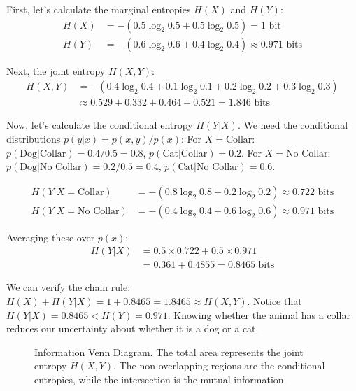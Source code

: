 First, let's calculate the marginal entropies $H(X)$ and $H(Y)$:
\begin{align*}
    H(X) &= - (0.5 \log_2 0.5 + 0.5 \log_2 0.5) = 1 \text{ bit} \\
    H(Y) &= - (0.6 \log_2 0.6 + 0.4 \log_2 0.4) \approx 0.971 \text{ bits}
\end{align*}

Next, the joint entropy $H(X, Y)$:
\begin{align*}
    H(X, Y) &= - (0.4 \log_2 0.4 + 0.1 \log_2 0.1 + 0.2 \log_2 0.2 + 0.3 \log_2 0.3) \\
    &\approx 0.529 + 0.332 + 0.464 + 0.521 = 1.846 \text{ bits}
\end{align*}

Now, let's calculate the conditional entropy $H(Y|X)$. We need the conditional distributions $p(y|x) = p(x, y)/p(x)$:
For $X = \text{Collar}$: $p(\text{Dog}|\text{Collar}) = 0.4/0.5 = 0.8$, $p(\text{Cat}|\text{Collar}) = 0.2$.
For $X = \text{No Collar}$: $p(\text{Dog}|\text{No Collar}) = 0.2/0.5 = 0.4$, $p(\text{Cat}|\text{No Collar}) = 0.6$.

\begin{align*}
    H(Y|X=\text{Collar}) &= - (0.8 \log_2 0.8 + 0.2 \log_2 0.2) \approx 0.722 \text{ bits} \\
    H(Y|X=\text{No Collar}) &= - (0.4 \log_2 0.4 + 0.6 \log_2 0.6) \approx 0.971 \text{ bits}
\end{align*}

Averaging these over $p(x)$:
\begin{align*}
    H(Y|X) &= 0.5 \times 0.722 + 0.5 \times 0.971 \\
    &= 0.361 + 0.4855 = 0.8465 \text{ bits}
\end{align*}

We can verify the chain rule: $H(X) + H(Y|X) = 1 + 0.8465 = 1.8465 \approx H(X, Y)$.
Notice that $H(Y|X) = 0.8465 < H(Y) = 0.971$. Knowing whether the animal has a collar reduces our uncertainty about whether it is a dog or a cat.

\begin{figure}[ht]
    \centering
    \caption{Information Venn Diagram. The total area represents the joint entropy $H(X,Y)$. The non-overlapping regions are the conditional entropies, while the intersection is the mutual information.}
    \label{fig:venn}
\end{figure}

